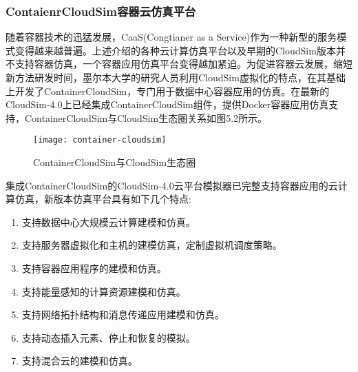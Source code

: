 \subsubsection{ContaienrCloudSim容器云仿真平台}
随着容器技术的迅猛发展，CaaS(Congtianer as a Service)作为一种新型的服务模式变得越来越普遍。上述介绍的各种云计算仿真平台以及早期的CloudSim版本并不支持容器仿真，一个容器应用仿真平台变得越加紧迫。为促进容器云发展，缩短新方法研发时间，墨尔本大学的研究人员利用CloudSim虚拟化的特点，在其基础上开发了ContainerCloudSim，专门用于数据中心容器应用的仿真。在最新的CloudSim-4.0上已经集成ContainerCloudSim组件，提供Docker容器应用仿真支持，ContainerCloudSim与CloudSim生态圈关系如图5.2所示。
\begin{figure}[H] %
	\centering
	\texttt{[image: container-cloudsim]}
	\caption{ContainerCloudSim与CloudSim生态圈}
\end{figure}
集成ContainerCloudSim的CloudSim-4.0云平台模拟器已完整支持容器应用的云计算仿真，新版本仿真平台具有如下几个特点:
\begin{enumerate}[(1)]
	\item 支持数据中心大规模云计算建模和仿真。
	\item 支持服务器虚拟化和主机的建模仿真，定制虚拟机调度策略。
	\item 支持容器应用程序的建模和仿真。
	\item 支持能量感知的计算资源建模和仿真。
	\item 支持网络拓扑结构和消息传递应用建模和仿真。
	\item 支持动态插入元素、停止和恢复的模拟。
	\item 支持混合云的建模和仿真。
\end{enumerate}

